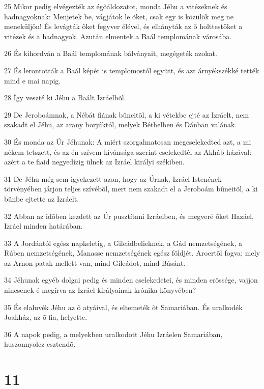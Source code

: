 \par 25 Mikor pedig elvégezték az égõáldozatot, monda Jéhu a vitézeknek és hadnagyoknak: Menjetek be, vágjátok le õket, csak egy is közülök meg ne meneküljön! És levágták õket fegyver élével, és elhányták az õ holttestöket a vitézek és a hadnagyok. Azután elmentek a Baál templomának városába.
\par 26 És kihordván a Baál templomának bálványait, megégeték azokat.
\par 27 És lerontották a Baál képét is templomostól együtt, és azt árnyékszékké tették mind e mai napig.
\par 28 Így veszté ki Jéhu a Baált Izráelbõl.
\par 29 De Jeroboámnak, a Nébát fiának bûneitõl, a ki vétekbe ejté az Izráelt, nem szakadt el Jéhu, az arany borjúktól, melyek Béthelben és Dánban valának.
\par 30 És monda az Úr Jéhunak: A miért szorgalmatosan megcselekedted azt, a mi nékem tetszett, és az én szívem kívánsága szerint cselekedtél az Akháb házával: azért a te fiaid negyedízig ülnek az Izráel királyi székiben.
\par 31 De Jéhu még sem igyekezett azon, hogy az Úrnak, Izráel Istenének törvényében járjon teljes szívébõl, mert nem szakadt el a Jeroboám bûneitõl, a ki bûnbe ejtette az Izráelt.
\par 32 Abban az idõben kezdett az Úr pusztítani Izráelben, és megveré õket Hazáel, Izráel minden határában.
\par 33 A Jordántól egész napkeletig, a Gileádbelieknek, a Gád nemzetségének, a Rúben nemzetségének, Manasse nemzetségének egész földjét. Aroertõl fogva; mely az Arnon patak mellett van, mind Gileádot, mind Básánt.
\par 34 Jéhunak egyéb dolgai pedig és minden cselekedetei, és minden erõssége, vajjon nincsenek-é megírva az Izráel királyainak krónika-könyvében?
\par 35 És elaluvék Jéhu az õ atyáival, és eltemeték õt Samariában. És uralkodék Joakház, az õ fia, helyette.
\par 36 A napok pedig, a melyekben uralkodott Jéhu Izráelen Samariában, huszonnyolcz esztendõ.

\chapter{11}

